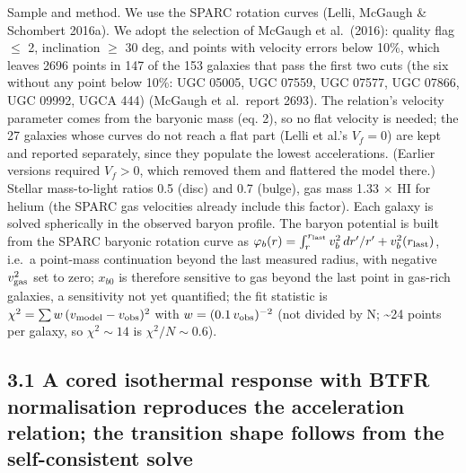 \documentclass[
  10pt,
]{article}
\begin{document}
Sample and method. We use the SPARC rotation curves (Lelli, McGaugh \& Schombert 2016a). We adopt the selection of McGaugh et al.~(2016): quality flag $\le$ 2, inclination $\ge$ 30 deg, and points with velocity errors below 10\%, which leaves 2696 points in 147 of the 153 galaxies that pass the first two cuts (the six without any point below 10\%: UGC 05005, UGC 07559, UGC 07577, UGC 07866, UGC 09992, UGCA 444) (McGaugh et al.\ report 2693). The relation's velocity parameter comes from the baryonic mass (eq. 2), so no flat velocity is needed; the 27 galaxies whose curves do not reach a flat part (Lelli et al.'s $V_f=0$) are kept and reported separately, since they populate the lowest accelerations. (Earlier versions required $V_f>0$, which removed them and flattered the model there.) Stellar mass-to-light ratios 0.5 (disc) and
0.7 (bulge), gas mass 1.33 $\times$ HI for helium (the SPARC gas velocities already include this factor). Each galaxy is solved spherically in the observed baryon profile. The baryon potential is built from the SPARC baryonic rotation curve as $\varphi_b(r)=\int_r^{r_{\rm last}}v_b^2\,dr'/r'+v_b^2(r_{\rm last})$, i.e.\ a point-mass continuation beyond the last measured radius, with negative $v_{\rm gas}^2$ set to zero; $x_{b0}$ is therefore sensitive to gas beyond the last point in gas-rich galaxies, a sensitivity not yet quantified; the fit statistic is $\chi^2=\sum w\,(v_{\rm model}-v_{\rm obs})^2$ with $w=(0.1\,v_{\rm obs})^{-2}$ (not divided by N;
\textasciitilde{}24 points per galaxy, so $\chi^2\sim 14$ is $\chi^2/N\sim 0.6$).

\subsection{3.1 A cored isothermal response with BTFR normalisation reproduces the acceleration relation; the transition shape follows from the self-consistent solve}\label{a-cored-isothermal-response-with-btfr-normalisation-reproduces-the-acceleration-relation-the-transition-shape-is-the-output}
\end{document}
